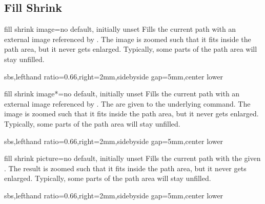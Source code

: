 \documentclass{article}
\newenvironment{dispExample*}[1]{\par}{}
\begin{document}
\clearpage
\subsection{Fill Shrink}
\begin{docTikzKey}{fill shrink image}{=}{no default, initially unset}
  Fills the current path with an external image referenced by .
  The image is zoomed such that it fits inside the path area, but it never
  gets enlarged.
  Typically, some parts of the path area will stay unfilled.
\begin{dispExample*}{sbs,lefthand ratio=0.66,right=2mm,sidebyside gap=5mm,center lower}
\end{dispExample*}
\end{docTikzKey}


\begin{docTikzKey}{fill shrink image*}{=}{no default, initially unset}
  Fills the current path with an external image referenced by .
  The  are given to the underlying  command.
  The image is zoomed such that it fits inside the path area, but it never
  gets enlarged.
  Typically, some parts of the path area will stay unfilled.
\begin{dispExample*}{sbs,lefthand ratio=0.66,right=2mm,sidebyside gap=5mm,center lower}
\end{dispExample*}
\end{docTikzKey}


\begin{docTikzKey}{fill shrink picture}{=}{no default, initially unset}
  Fills the current path with the given .
  The result is zoomed such that it fits inside the path area, but it never
  gets enlarged.
  Typically, some parts of the path area will stay unfilled.
\begin{dispExample*}{sbs,lefthand ratio=0.66,right=2mm,sidebyside gap=5mm,center lower}
\end{dispExample*}
\end{docTikzKey}
\end{document}
